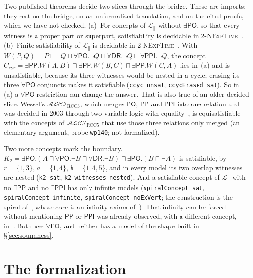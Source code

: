 \documentclass[11pt]{article}
\newcommand{\ALCIRCC}[1]{\mathcal{ALCI}_{\mathrm{RCC#1}}}
\newcommand{\DR}{\mathsf{DR}}
\newcommand{\PO}{\mathsf{PO}}
\newcommand{\PP}{\mathsf{PP}}
\newcommand{\PPI}{\mathsf{PPI}}
\newcommand{\code}[1]{\texttt{#1}}
\theoremstyle{plain}
\theoremstyle{definition}
\begin{document}
Two published theorems decide two slices through the bridge. These are
imports: they rest on the bridge, on an unformalized translation, and on the
cited proofs, which we have not checked. (a)~For concepts of
$\mathcal L_{\parallel}$ without $\exists\PO$, so that every witness is a
proper part or superpart, satisfiability is decidable in
2-\textsc{NExpTime}~\cite{SzwastTendera2018}. (b)~Finite satisfiability of
$\mathcal L_{\parallel}$ is decidable in
2-\textsc{NExpTime}~\cite{PrattHartmann2018}. With
$W(P,Q)=P\sqcap\neg Q\sqcap\forall\PO.\neg Q\sqcap\forall\DR.\neg
Q\sqcap\forall\PPI.\neg Q$, the concept
$C_{\mathrm{cyc}}=\exists\PP.W(A,B)\sqcap\exists\PP.W(B,C)\sqcap
\exists\PP.W(C,A)$ lies in~(a) and is unsatisfiable, because its three
witnesses would be nested in a cycle; erasing its three $\forall\PO$ conjuncts
makes it satisfiable (\code{ccyc\_unsat}, \code{ccycErased\_sat}). So in (a)
a $\forall\PO$ restriction can change the answer. That is also true of an
older decided slice: Wessel's $\ALCIRCC3$, which merges $\PO$, $\PP$ and $\PPI$
into one relation and was decided in 2003 through two-variable logic with
equality~\cite[\S4.3]{Wessel2003}, is equisatisfiable with the concepts of
$\ALCIRCC{5}$ that use those three relations only merged (an elementary
argument, probe \texttt{wp140}; not formalized).

Two more concepts mark the boundary.
$K_2=\exists\PO.(A\sqcap\forall\PO.\neg B\sqcap\forall\DR.\neg B)\sqcap
\exists\PO.(B\sqcap\neg A)$ is satisfiable, by $r=\{1,3\}$, $a=\{1,4\}$,
$b=\{1,4,5\}$, and in every model its two overlap witnesses are nested
(\code{k2\_sat}, \code{k2\_witnesses\_nested}). And a satisfiable concept of
$\mathcal L_{\parallel}$ with no $\exists\PP$ and no $\exists\PPI$ has only
infinite models (\code{spiralConcept\_sat}, \code{spiralConcept\_infinite},
\code{spiralConcept\_noExVert}; the construction is the spiral
of~\cite{MarzecTendera2026}, whose core is an infinity axiom
of~\cite[\S5]{SzwastTendera2018}). That infinity can be forced without mentioning
$\PP$ or $\PPI$ was already observed, with a different concept,
in~\cite[\S5.2]{Wessel2003}. Both use $\forall\PO$, and neither has a model
of the shape built in \S\ref{sec:soundness}.

\section{The formalization}
\label{sec:lean}
\end{document}
